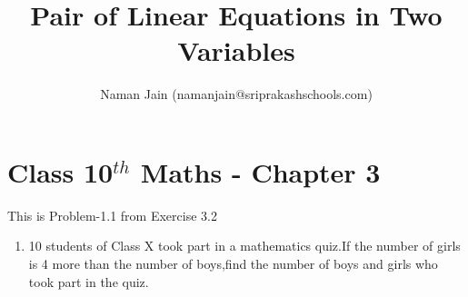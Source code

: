 \documentclass[10pt]{article}
\title{Pair of Linear Equations in Two Variables}
\author{Naman Jain  (namanjain@sriprakashschools.com)}
\begin{document}
\maketitle
\section*{Class 10$^{th}$ Maths - Chapter 3}
This is Problem-1.1 from Exercise 3.2
\begin{enumerate}
\item 10 students of Class X took part in a mathematics quiz.If the number of girls is 4 more than the number of boys,find the number of boys and girls who took part in the quiz.
	

\end{enumerate}
\end{document}
